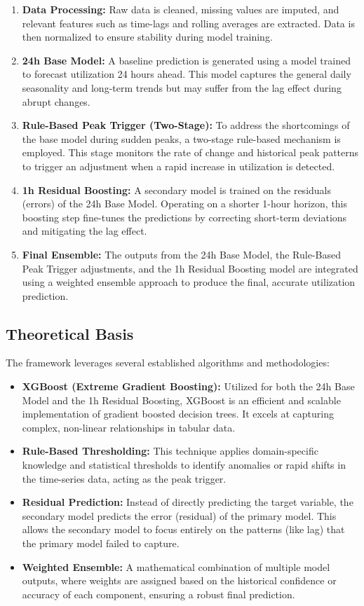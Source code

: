 \documentclass[journal]{IEEEtran}
\begin{document}
\begin{enumerate}
    \item \textbf{Data Processing:} Raw data is cleaned, missing values are imputed, and relevant features such as time-lags and rolling averages are extracted. Data is then normalized to ensure stability during model training.
    \item \textbf{24h Base Model:} A baseline prediction is generated using a model trained to forecast utilization 24 hours ahead. This model captures the general daily seasonality and long-term trends but may suffer from the lag effect during abrupt changes.
    \item \textbf{Rule-Based Peak Trigger (Two-Stage):} To address the shortcomings of the base model during sudden peaks, a two-stage rule-based mechanism is employed. This stage monitors the rate of change and historical peak patterns to trigger an adjustment when a rapid increase in utilization is detected.
    \item \textbf{1h Residual Boosting:} A secondary model is trained on the residuals (errors) of the 24h Base Model. Operating on a shorter 1-hour horizon, this boosting step fine-tunes the predictions by correcting short-term deviations and mitigating the lag effect.
    \item \textbf{Final Ensemble:} The outputs from the 24h Base Model, the Rule-Based Peak Trigger adjustments, and the 1h Residual Boosting model are integrated using a weighted ensemble approach to produce the final, accurate utilization prediction.
\end{enumerate}

\subsection{Theoretical Basis}
The framework leverages several established algorithms and methodologies:
\begin{itemize}
    \item \textbf{XGBoost (Extreme Gradient Boosting):} Utilized for both the 24h Base Model and the 1h Residual Boosting, XGBoost is an efficient and scalable implementation of gradient boosted decision trees. It excels at capturing complex, non-linear relationships in tabular data.
    \item \textbf{Rule-Based Thresholding:} This technique applies domain-specific knowledge and statistical thresholds to identify anomalies or rapid shifts in the time-series data, acting as the peak trigger.
    \item \textbf{Residual Prediction:} Instead of directly predicting the target variable, the secondary model predicts the error (residual) of the primary model. This allows the secondary model to focus entirely on the patterns (like lag) that the primary model failed to capture.
    \item \textbf{Weighted Ensemble:} A mathematical combination of multiple model outputs, where weights are assigned based on the historical confidence or accuracy of each component, ensuring a robust final prediction.
\end{itemize}
\end{document}
